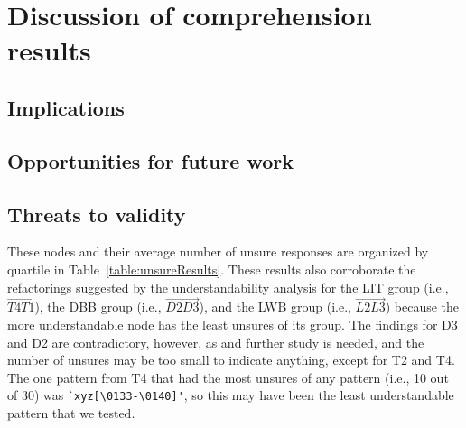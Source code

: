 \section{Discussion of comprehension results}
\subsection{Implications}
\subsection{Opportunities for future work}
\subsection{Threats to validity}


These nodes and their average number of unsure responses are organized by quartile in Table~\ref{table:unsureResults}.
These results also corroborate the refactorings suggested by the understandability analysis for the LIT group (i.e., $\overrightarrow{T4 T1}$), the DBB group (i.e.,  $\overrightarrow{D2 D3}$), and the LWB group (i.e., $\overrightarrow{L2 L3}$) because the more understandable node has the least unsures of its group.
The findings for D3 and D2 are contradictory, however, as  and further study is needed, and the number of unsures may be too small to indicate anything, except for T2 and T4.  The one pattern from T4 that had the most unsures of any pattern (i.e., 10 out of 30) was \verb!`xyz[\0133-\0140]'!, so this may have been the least understandable pattern that we tested.

